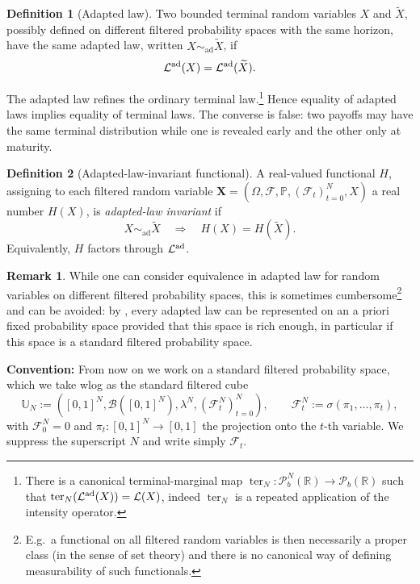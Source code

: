 \documentclass[a4paper]{amsart}
\theoremstyle{definition}
\newtheorem{definition}[definition]{Definition}
\newtheorem{remark}[remark]{Remark}
\newcommand{\R}{\mathbb{R}}
\newcommand{\F}{\mathcal{F}}
\newcommand{\simad}{\sim_{\mathrm{ad}}}
\newcommand{\law}{\mathcal{L}}
\newcommand{\Pc}{\mathcal P}
\renewcommand{\P}{\mathbb{P}}
\newcommand{\lawad}{\law^{\textup{ad}}}
\begin{document}
\begin{definition}[Adapted law]
\label{def:adapted-law}
Two bounded terminal random variables \(X\) and \(\widetilde X\), possibly
defined on different filtered probability spaces with the same horizon, have
the same adapted law, written \(X\simad\widetilde X\), if
\[
\lawad(X)=\lawad(\widetilde X).
\]
\end{definition}

The adapted law refines the ordinary terminal law.\footnote{There is a
canonical terminal-marginal map
\(\operatorname{ter}_N:\Pc_b^N(\R)\to\Pc_b(\R)\) such that
\(\operatorname{ter}_N(\lawad(X))=\law(X)\), indeed
\(\operatorname{ter}_N\) is a repeated application of the intensity operator.}
Hence equality of adapted laws implies equality of terminal laws. The converse
is false: two payoffs may have the same terminal distribution while one is
revealed early and the other only at maturity.

\begin{definition}[Adapted-law-invariant functional]
\label{def:ad-li-functional}
A real-valued functional \(H\), assigning to each filtered random variable
\(\mathbf X=(\Omega,\F,\P,(\F_t)_{t=0}^N,X)\) a real number \(H(X)\), is
\emph{adapted-law invariant} if
\[
X\simad\widetilde X
\quad\Longrightarrow\quad
H(X)=H(\widetilde X).
\]
Equivalently, \(H\) factors through \(\lawad\).
\end{definition}

\begin{remark}
\label{rem:standardEnough}
While one can consider equivalence in adapted law for random variables on
different filtered probability spaces, this is sometimes cumbersome\footnote{
E.g.\ a functional on all filtered random variables is then necessarily a
proper class (in the sense of set theory) and there is no canonical way of
defining measurability of such functionals.} and can be avoided: by
\cite{BePaSc25}, every adapted law can be represented on an a priori fixed
probability space provided that this space is rich enough, in particular if
this space is a standard filtered probability space.
\end{remark}

{\bf Convention:} From now on we work on a standard filtered probability space,
which we take wlog as the standard filtered cube
\[
\mathbb U_N
:=
([0,1]^N,\mathcal B([0,1]^N),\lambda^N,(\F_t^N)_{t=0}^N),
\qquad
\F_t^N:=\sigma(\pi_1,\dots,\pi_t),
\]
with \(\F_0^N=0\) and $\pi_t :[0,1]^N \to [0,1]$ the projection onto the $t$-th variable. We suppress the superscript \(N\) and write simply
\(\F_t\).
\end{document}
